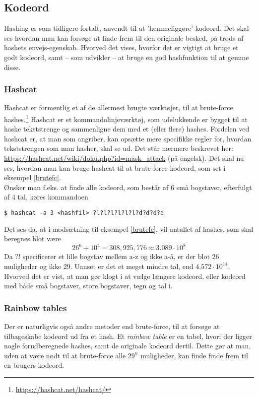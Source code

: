 \subsection{Kodeord}
Hashing er som tidligere fortalt, anvendt til at 'hemmeliggøre' kodeord.
Det skal ses hvordan man kan forsøge at finde frem til den originale besked, på trods af hashets envejs-egenskab.
Hvorved det vises, hvorfor det er vigtigt at bruge et godt kodeord, samt -- som udvikler -- at bruge en god hashfunktion til at gemme disse.


    \subsubsection{Hashcat}
    Hashcat er formentlig et af de allermest brugte værktøjer, til at brute-force hashes.\footnote{\url{https://hashcat.net/hashcat/}}
    Hashcat er et kommandolinjeværktøj, som udelukkende er bygget til at hashe tekststrenge og sammenligne dem med et (eller flere) hashes.
    Fordelen ved hashcat er, at man som angriber, kan opsætte mere specifikke regler for, hvordan tekststrengen som man hasher, skal se ud.
    Det står nærmere beskrevet her: \url{https://hashcat.net/wiki/doku.php?id=mask_attack} (på engelsk).
    Det skal nu ses, hvordan man kan bruge hashcat til at brute-force kodeord, som set i eksempel \ref{brutefc}.\\
    Ønsker man f.eks. at finde alle kodeord, som består af 6 små bogstaver, efterfulgt af 4 tal, køres kommandoen
    \begin{verbatim}
$ hashcat -a 3 <hashfil> ?l?l?l?l?l?l?d?d?d?d
    \end{verbatim}
    Det ses da, at i modsætning til eksempel \ref{brutefc}, vil antallet af hashes, som skal beregnes blot være
    \[26^6 + 10^4 = 308,925,776 \approx 3.089 \cdot 10^8\]
    Da \(?l\) specificerer et lille bogstav mellem a-z og ikke a-å, er der blot 26 muligheder og ikke 29.
    Uanset er det et meget mindre tal, end \(4.572 \cdot 10^{14}\). Hvorved det er vist, at man gør klogt i at vælge længere kodeord, eller kodeord med både små bogstaver, store bogstaver, tegn og tal i.

    \subsubsection{Rainbow tables}
    Der er naturligvis også andre metoder end brute-force, til at forsøge at tilbageskabe kodeord ud fra et hash.
    Et \emph{rainbow table} er en tabel, hvori der ligger nogle forudberegnede hashes, samt de originale kodeord dertil.\cite{rainbow}
    Dette gør at man, uden at være nødt til at brute-force alle \(29^n\) muligheder, kan finde finde frem til en brugers kodeord.


